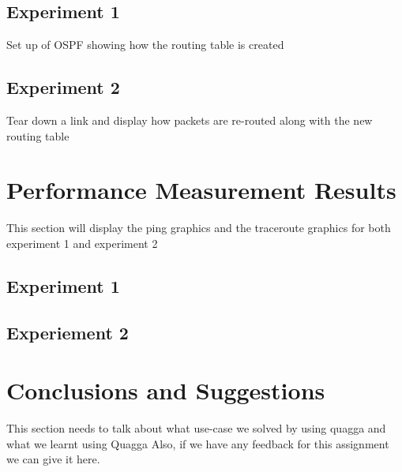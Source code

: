 \documentclass{article}
\begin{document}
\subsection{Experiment 1}
Set up of OSPF showing how the routing table is created
\subsection{Experiment 2}
Tear down a link and display how packets are re-routed along with the new routing table
\clearpage
\section{Performance Measurement Results}
This section will display the ping graphics and the traceroute graphics for both experiment 1 and experiment 2
\subsection{Experiment 1}
\subsection{Experiement 2}
\clearpage
\section{Conclusions and Suggestions}
This section needs to talk about what use-case we solved by using quagga and what we learnt using Quagga
Also, if we have any feedback for this assignment we can give it here.
\end{document}
